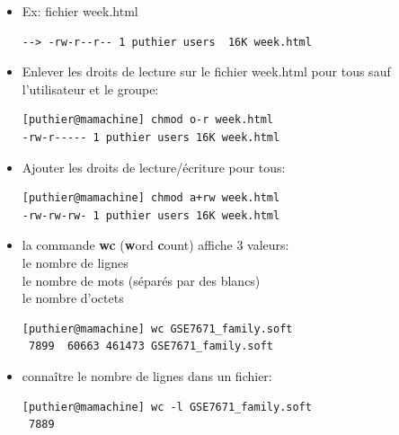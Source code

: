\documentclass[10pt, xcolor=dvipsnames]{beamer}
\begin{document}
\begin{frame}[fragile]

    \begin{itemize}

    \item Ex: fichier week.html\\
    \begin{verbatim}
--> -rw-r--r-- 1 puthier users  16K week.html
    \end{verbatim}

    \item Enlever les droits de lecture sur le fichier week.html pour tous sauf l'utilisateur et le groupe:\\
    \begin{verbatim}
[puthier@mamachine] chmod o-r week.html
-rw-r----- 1 puthier users 16K week.html
    \end{verbatim}

    \item Ajouter les droits de lecture/écriture pour tous:
    \begin{verbatim}
[puthier@mamachine] chmod a+rw week.html
-rw-rw-rw- 1 puthier users 16K week.html
    \end{verbatim}

    \end{itemize}

\end{frame}



\begin{frame}[fragile]

    \begin{itemize}

          \item la commande \textbf{wc} (\textbf{w}ord \textbf{c}ount) affiche 3 valeurs:\\
            le nombre de lignes\\
            le nombre de mots (séparés par des blancs)\\
            le nombre d'octets\\
    
        \begin{verbatim}
[puthier@mamachine] wc GSE7671_family.soft
 7899  60663 461473 GSE7671_family.soft
        \end{verbatim}
    
          \item connaître le nombre de lignes dans un fichier:
    
        \begin{verbatim}
[puthier@mamachine] wc -l GSE7671_family.soft
 7889
        \end{verbatim}

    \end{itemize}

\end{frame}
\end{document}

